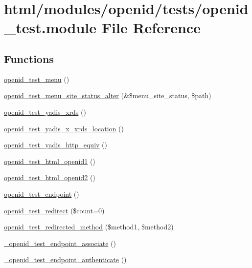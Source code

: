 \hypertarget{openid__test_8module}{
\section{html/modules/openid/tests/openid\_\-test.module File Reference}
\label{openid__test_8module}
}
\subsection*{Functions}
\begin{DoxyCompactItemize}
\item 
\hyperlink{openid__test_8module_a601b7466dc5349b7eb9687a630ee74cf}{openid\_\-test\_\-menu} ()
\item 
\hyperlink{openid__test_8module_ada79e0478bbc38e21a7bb7981e9797ee}{openid\_\-test\_\-menu\_\-site\_\-status\_\-alter} (\&\$menu\_\-site\_\-status, \$path)
\item 
\hyperlink{openid__test_8module_aa6175d4d4d7c7f49a8727d99cfc71fa5}{openid\_\-test\_\-yadis\_\-xrds} ()
\item 
\hyperlink{openid__test_8module_a9159017197fedc11b3676d8fbd9c6d8d}{openid\_\-test\_\-yadis\_\-x\_\-xrds\_\-location} ()
\item 
\hyperlink{openid__test_8module_a76e741fd2ce4dadb8644d3617066095d}{openid\_\-test\_\-yadis\_\-http\_\-equiv} ()
\item 
\hyperlink{openid__test_8module_ad596225f599d5e3b6f8f8e336ea2db57}{openid\_\-test\_\-html\_\-openid1} ()
\item 
\hyperlink{openid__test_8module_aac0cf89f06ec26002f00a1966af2a82b}{openid\_\-test\_\-html\_\-openid2} ()
\item 
\hyperlink{openid__test_8module_a2d237a2f5e4762d3493ea851217e4e90}{openid\_\-test\_\-endpoint} ()
\item 
\hyperlink{openid__test_8module_a4e8a0f0bc8c31c066ae66b927521775a}{openid\_\-test\_\-redirect} (\$count=0)
\item 
\hyperlink{openid__test_8module_a3667e639dafbeed1e4ebf721bf992716}{openid\_\-test\_\-redirected\_\-method} (\$method1, \$method2)
\item 
\hyperlink{openid__test_8module_abcc42b34b663243bde0ea93fea7d5b2c}{\_\-openid\_\-test\_\-endpoint\_\-associate} ()
\item 
\hyperlink{openid__test_8module_a2b1e3e0e1513bdb25d5bfb82dfc8f391}{\_\-openid\_\-test\_\-endpoint\_\-authenticate} ()
\end{DoxyCompactItemize}


